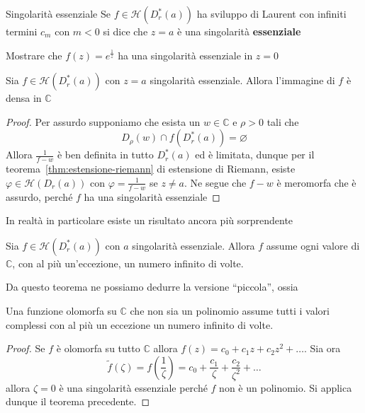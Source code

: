 \begin{definition}{Singolarità essenziale}\label{def:sing-essenziale}
    Se \(f \in \mathcal{H}{(D^{*}_r{(a)})}\) ha sviluppo di Laurent con infiniti
    termini \(c_m\) con \(m < 0\) si dice che \(z=a\) è una singolarità
    \textbf{essenziale}
\end{definition}
\begin{eser}
    Mostrare che \(f{(z)} = e^{\frac{1}{z}}\) ha una singolarità essenziale in
    \(z=0\) 
\end{eser}
\begin{theorem}\label{thm:casorata-weierstrass}
    Sia \(f \in \mathcal{H}{(D^*_r{(a)})}\) con \(z=a\) singolarità essenziale.
    Allora l'immagine di \(f\) è densa in \(\mathbb{C}\) 
\end{theorem}
\begin{proof}
    Per assurdo supponiamo che esista un \(w \in \mathbb{C}\) e \(\rho > 0\)
    tali che
\[
    D_\rho{(w)} \cap f{(D^{*}_r{(a)})} = \varnothing
\]
    Allora \(\displaystyle \frac{1}{f-w}\) è ben definita in tutto \(D^{*}_r{(a)}\) ed è
    limitata, dunque per il teorema~\ref{thm:estensione-riemann} di estensione
    di Riemann, esiste \(\varphi  \in \mathcal{H}{(D_r{(a)})}\) con
    \(\displaystyle \varphi = \frac{1}{f - w}\) se \(z\neq a\). Ne segue che
    \(f-w\) è meromorfa che è assurdo, perché \(f\) ha una singolarità
    essenziale
\end{proof}
In realtà in particolare esiste un risultato ancora più sorprendente
\begin{theorem}\label{thm:lol-1eccezione}
    Sia \(f \in \mathcal{H}{(D^{*}_r{(a)})}\) con \(a\) singolarità essenziale.
    Allora \(f\) assume ogni valore di \(\mathbb{C}\), con al più un'eccezione,
    un numero infinito di volte.
\end{theorem}
Da questo teorema ne possiamo dedurre la versione ``piccola'', ossia
\begin{theorem}
    Una funzione olomorfa su \(\mathbb{C}\) che non sia un polinomio assume
    tutti i valori complessi con al più un eccezione un numero infinito di
    volte.
\end{theorem}
\begin{proof}
    Se \(f\) è olomorfa su tutto \(\mathbb{C}\) allora \(f{(z)} = c_{0} + c_{1}
    z + c_{2}z^2 + \dots\). Sia ora 
\[
    \tilde{f}{(\zeta)} = f{\left(\frac{1}{\zeta}\right)} = c_{0}+ \frac{c_{1}}{\zeta} +
    \frac{c_{2}}{\zeta^2} + \dots
\]
    allora \(\zeta=0\) è una singolarità essenziale perché \(f\) non è un
    polinomio. Si applica dunque il teorema precedente.
\end{proof}

